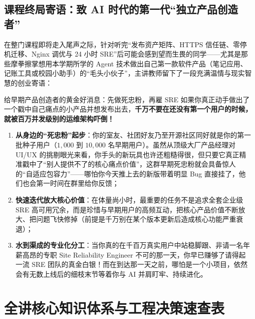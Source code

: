 \documentclass[a4paper]{article}
\begin{document}
\subsection{课程终局寄语：致 AI 时代的第一代“独立产品创造者”}

在整门课程即将走入尾声之际，针对听完“发布资产矩阵、HTTPS 信任链、零停机迁移、Nginx 调优与 24 小时 SRE”后可能会感到望而生畏的同学——尤其是那些摩拳擦掌想用本学期所学的 Agent 技术做出自己第一款软件产品（笔记应用、记账工具或校园小助手）的“毛头小伙子”，主讲教师留下了一段充满温情与现实智慧的创业寄语：

\begin{practicebox}{给早期产品创造者的黄金好消息：先做死忠粉，再雇 SRE}
如果你真正动手做出了一个戳中自己痛点的小产品并想发布出去，\textbf{千万不要在还没有第一个用户的时候，就被百万并发级别的运维架构吓倒！}
\begin{enumerate}
    \item \textbf{从身边的“死忠粉”起步}：你的室友、社团好友乃至开源社区同好就是你的第一批种子用户（$1,000$ 到 $10,000$ 名早期用户）。虽然从顶级大厂产品经理对 UI/UX 的挑剔眼光来看，你手头的新玩具也许还粗糙得很，但只要它真正精准戳中了“别人提供不了的核心痛点价值”，这群早期死忠粉就会具备惊人的“自适应包容力”——哪怕你今天推上去的新版带着明显 Bug 直接挂了，他们也会第一时间在群里给你反馈；
    \item \textbf{快速迭代放大核心价值}：在体量尚小时，最重要的任务不是追求全套企业级 SRE 高可用冗余，而是珍惜与早期用户的高频互动，把核心产品价值不断放大、把问题飞快修掉（前提是千万别在某个版本更新后造成核心功能严重衰退）；
    \item \textbf{水到渠成的专业化分工}：当你真的在千百万真实用户中站稳脚跟、非请一名年薪高昂的专职 Site Reliability Engineer 不可的那一天，你早已赚够了请得起一流 SRE 团队的真金白银！而在到达那一天之前，哪怕是一个小项目，依然会有无数上线后的细枝末节等着你与 AI 并肩盯牢、持续进化。
\end{enumerate}
\end{practicebox}

\newpage
\section*{全讲核心知识体系与工程决策速查表}
\end{document}
